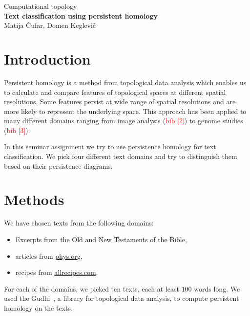 \documentclass[12pt,a4paper]{amsart}
\begin{document}
\thispagestyle{empty}
\begin{center}{\large
Computational topology\\[4mm]
{\bf Text classification using persistent homology}\\[4mm]
Matija Čufar, Domen Keglevič\\[6mm]
}
\end{center}
\bigskip

\section{Introduction}
Persistent homology is a method from topological data analysis which enables us to calculate and 
compare features of topological spaces at different spatial resolutions. Some features persist 
at wide range of spatial resolutions and are more likely to represent the underlying space. This 
approach  has been applied to many different domains ranging from image analysis
 (\textcolor{red}{bib [2]}) to
  genome studies (\textcolor{red}{bib [3]}).

 In this seminar assignment we try to use persistence homology for text classification. We pick four 
 different text domains and try to 
distinguish them based on their persistence diagrams.

\section{Methods}

We have chosen texts from the following domains:

\begin{itemize}
  \setlength\itemsep{0.5em}
\item Excerpts from the Old and New Testaments of the Bible,
\item articles from \url{phys.org},
\item recipes from \url{allrecipes.com}.
\end{itemize}


For each of the domains, we picked ten texts, each at least $100$ words long. We
used the Gudhi~\cite{maria2014gudhi}, a library for topological data analysis,
to compute persistent homology on the texts.
\end{document}
